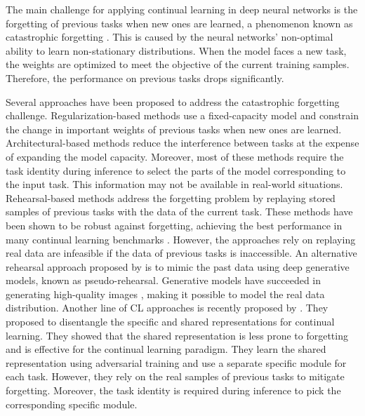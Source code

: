 \documentclass[letterpaper]{article} %
\begin{document}
The main challenge for applying continual learning in deep neural networks is the forgetting of previous tasks when new ones are learned, a phenomenon known as catastrophic forgetting \cite{mccloskey1989catastrophic}. This is caused by the neural networks' non-optimal ability to learn non-stationary distributions. When the model faces a new task, the weights are optimized to meet the objective of the current training samples. Therefore, the performance on previous tasks drops significantly. 

Several approaches have been proposed to address the catastrophic forgetting challenge. Regularization-based methods use a fixed-capacity model and constrain the change in important weights of previous tasks when new ones are learned. Architectural-based methods reduce the interference between tasks at the expense of expanding the model capacity. Moreover, most of these methods require the task identity during inference to select the parts of the model corresponding to the input task. This information may not be available in real-world situations. Rehearsal-based methods address the forgetting problem by replaying stored samples of previous tasks with the data of the current task. These methods have been shown to be robust against forgetting, achieving the best performance in many continual learning benchmarks \cite{VanDeVen2018a,Hsu18_EvalCL}. However, the approaches rely on replaying real data are infeasible if the data of previous tasks is inaccessible. An alternative rehearsal approach proposed by \cite{mocanu2016online, shin2017continual} is to mimic the past data using deep generative models, known as pseudo-rehearsal. Generative models have succeeded in generating high-quality images \cite{bao2017cvae,miyato2018cgans,guo2019auto}, making it possible to model the real data distribution. Another line of CL approaches is recently proposed by \cite{ebrahimi2020adversarial}. They proposed to disentangle the specific and shared representations for continual learning. They showed that the shared representation is less prone to forgetting and is effective for the continual learning paradigm. They learn the shared representation using adversarial training and use a separate specific module for each task. However, they rely on the real samples of previous tasks to mitigate forgetting. Moreover, the task identity is required during inference to pick the corresponding specific module.
\end{document}
